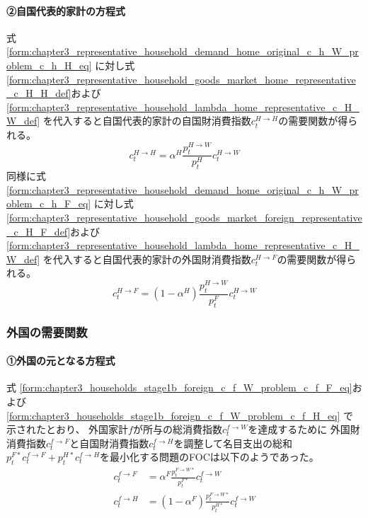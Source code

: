 \paragraph{②自国代表的家計の方程式}
\label{sec:chapter3_representative_household_demand_home_representative}
式
\eqref{form:chapter3_representative_household_demand_home_original_c_h_W_problem_c_h_H_eq}
に対し式
\eqref{form:chapter3_representative_household_goods_market_home_representative_c_H_H_def}および
\eqref{form:chapter3_representative_household_lambda_home_representative_c_H_W_def}
を代入すると自国代表的家計の自国財消費指数\(c_t^{H\to H}\)の需要関数が得られる。
\begin{equation}
\label{form:chapter3_representative_household_demand_home_representative_c_H_H_eq}
    c_t^{H\to H}=\alpha^H\frac{p_t^{H\to W}}{p_t^H}c_t^{H\to W}
\end{equation}
同様に式
\eqref{form:chapter3_representative_household_demand_home_original_c_h_W_problem_c_h_F_eq}
に対し式
\eqref{form:chapter3_representative_household_goods_market_foreign_representative_c_H_F_def}および
\eqref{form:chapter3_representative_household_lambda_home_representative_c_H_W_def}
を代入すると自国代表的家計の外国財消費指数\(c_t^{H\to F}\)の需要関数が得られる。
\begin{equation}
\label{form:chapter3_representative_household_demand_home_representative_c_H_F_eq}
    c_t^{H\to F}=(1-\alpha^H)\frac{p_t^{H\to W}}{p_t^F}c_t^{H\to W}
\end{equation}

\subsubsection{外国の需要関数}
\label{sec:chapter3_representative_household_demand_foreign}

\paragraph{①外国の元となる方程式}
\label{sec:chapter3_representative_household_demand_foreign_original}
式
\eqref{form:chapter3_households_stage1b_foreign_c_f_W_problem_c_f_F_eq}および
\eqref{form:chapter3_households_stage1b_foreign_c_f_W_problem_c_f_H_eq}
で示されたとおり、
外国家計\(f\)が所与の総消費指数\(c_t^{f\to W}\)を達成するために
外国財消費指数\(c_t^{f\to F}\)と自国財消費指数\(c_t^{f\to H}\)を調整して名目支出の総和
\(p_t^{F*}c_t^{f\to F}+p_t^{H*}c_t^{f\to H}\)を最小化する問題のFOCは以下のようであった。
\begin{align}
\label{form:chapter3_representative_household_demand_foreign_original_c_f_W_problem_c_f_F_eq}
    c_t^{f\to F}&=\alpha^F\frac{p_t^{F\to W*}}{p_t^{F*}}c_t^{f\to W} \\
\label{form:chapter3_representative_household_demand_foreign_original_c_f_W_problem_c_f_H_eq}
    c_t^{f\to H}&=(1-\alpha^F)\frac{p_t^{F\to W*}}{p_t^{H*}}c_t^{f\to W}
\end{align}

